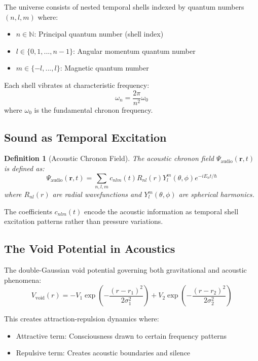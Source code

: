 \documentclass[12pt]{article}
\newtheorem{definition}{Definition}
\begin{document}
The universe consists of nested temporal shells indexed by quantum numbers $(n, l, m)$ where:
\begin{itemize}
\item $n \in \mathbb{N}$: Principal quantum number (shell index)
\item $l \in \{0, 1, ..., n-1\}$: Angular momentum quantum number
\item $m \in \{-l, ..., l\}$: Magnetic quantum number
\end{itemize}

Each shell vibrates at characteristic frequency:
\begin{equation}
\omega_n = \frac{2\pi}{n^2} \omega_0
\end{equation}
where $\omega_0$ is the fundamental chronon frequency.

\subsection{Sound as Temporal Excitation}

\begin{definition}[Acoustic Chronon Field]
The acoustic chronon field $\Psi_{\text{audio}}(\mathbf{r}, t)$ is defined as:
\begin{equation}
\Psi_{\text{audio}}(\mathbf{r}, t) = \sum_{n,l,m} c_{nlm}(t) R_{nl}(r) Y_l^m(\theta, \phi) e^{-iE_n t/\hbar}
\end{equation}
where $R_{nl}(r)$ are radial wavefunctions and $Y_l^m(\theta, \phi)$ are spherical harmonics.
\end{definition}

The coefficients $c_{nlm}(t)$ encode the acoustic information as temporal shell excitation patterns rather than pressure variations.

\subsection{The Void Potential in Acoustics}

The double-Gaussian void potential governing both gravitational and acoustic phenomena:
\begin{equation}
V_{\text{void}}(r) = -V_1 \exp\left(-\frac{(r - r_1)^2}{2\sigma_1^2}\right) + V_2 \exp\left(-\frac{(r - r_2)^2}{2\sigma_2^2}\right)
\end{equation}

This creates attraction-repulsion dynamics where:
\begin{itemize}
\item Attractive term: Consciousness drawn to certain frequency patterns
\item Repulsive term: Creates acoustic boundaries and silence
\end{itemize}
\end{document}
